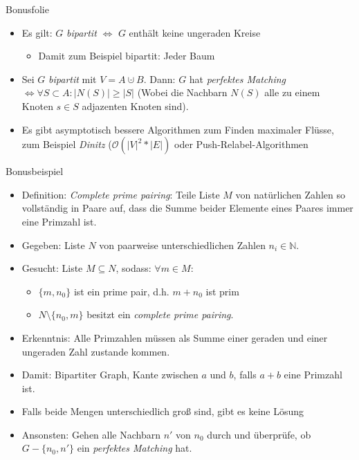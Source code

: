 \documentclass[18pt]{beamer}
\begin{document}
\begin{frame}{Bonusfolie}
\begin{itemize}
\item Es gilt: $G$ \textit{bipartit} $\Leftrightarrow$ $G$ enth\"alt keine ungeraden Kreise
\begin{itemize}
	\item Damit zum Beispiel bipartit: Jeder Baum
\end{itemize}
\item Sei $G$ \textit{bipartit} mit $V = A \cupdot B$. Dann: $G$ hat \textit{perfektes Matching} $\Leftrightarrow \forall S \subset A: |N(S)| \geq |S|$
(Wobei die Nachbarn $N(S)$ alle zu einem Knoten $s \in S$ adjazenten Knoten sind).
\item Es gibt asymptotisch bessere Algorithmen zum Finden maximaler Fl\"usse, zum Beispiel \textit{Dinitz} ($\mathcal{O}(|V|^{2} * |E|)$ oder Push-Relabel-Algorithmen
\end{itemize}
\end{frame}

\begin{frame}{Bonusbeispiel}
\begin{itemize}
\item Definition: \textit{Complete prime pairing}: Teile Liste $M$ von nat\"urlichen Zahlen so vollst\"andig in Paare auf,
dass die Summe beider Elemente eines Paares immer eine Primzahl ist.
\item Gegeben: Liste $N$ von paarweise unterschiedlichen Zahlen $n_{i} \in \mathbb{N}$.
\item Gesucht: Liste $M \subseteq N$, sodass: $\forall m \in M$:
\begin{itemize}
	\item  $\{m, n_{0}\}$ ist ein prime pair, d.h. $m + n_{0}$ ist prim
	\item $N \setminus \{n_{0}, m\}$ besitzt ein \textit{complete prime pairing}.
\end{itemize}
\pause
\item Erkenntnis: Alle Primzahlen m\"ussen als Summe einer geraden und einer ungeraden Zahl zustande kommen.
\item Damit: Bipartiter Graph, Kante zwischen $a$ und $b$, falls $a + b$ eine Primzahl ist.
\item Falls beide Mengen unterschiedlich gro{\ss} sind, gibt es keine L\"osung
\item Ansonsten: Gehen alle Nachbarn $n'$ von $n_{0}$ durch und \"uberpr\"ufe, ob $G - \{n_{0}, n'\}$ ein \textit{perfektes Matching} hat.
\end{itemize}
\end{frame}
\end{document}
